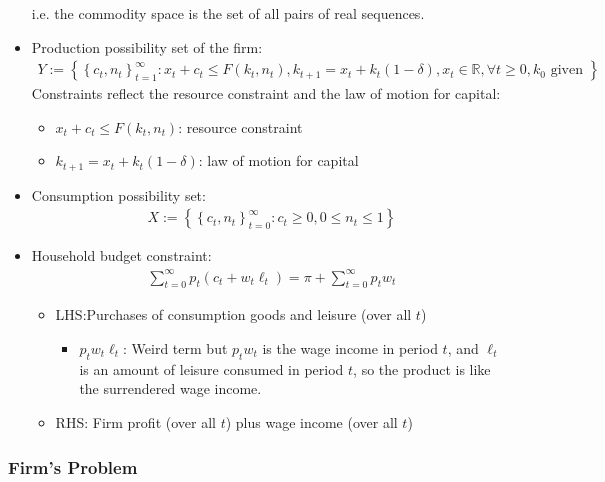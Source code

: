 \documentclass[10pt]{article}
\begin{document}
\begin{itemize}
        i.e. the commodity space is the set of all pairs of real sequences.
    \item Production possibility set of the firm: 
        \begin{align}
            Y:=\left\{\left\{c_t, n_t\right\}_{t=1}^{\infty}: x_t+c_t \leq F\left(k_t, n_t\right), k_{t+1}=x_t+k_t(1-\delta), x_t \in \mathbb{R}, \forall t \geq 0, k_0 \text { given }\right\}
        \end{align}
        Constraints reflect the resource constraint and the law of motion for capital:
        \begin{itemize}
            \item $x_t+c_t \leq F\left(k_t, n_t\right)$: resource constraint
            \item $k_{t+1}=x_t+k_t(1-\delta)$: law of motion for capital
        \end{itemize}
    \item Consumption possibility set:
        \begin{align}
            X:=\left\{\left\{c_t, n_t\right\}_{t=0}^{\infty}: c_t \geq 0,0 \leq n_t \leq 1\right\}
        \end{align}
    \item Household budget constraint:
        \begin{align}
            \sum_{t=0}^{\infty} p_t\left(c_t+w_t \ell_t\right)=\pi+\sum_{t=0}^{\infty} p_t w_t
        \end{align}
        \begin{itemize}
            \item LHS:Purchases of consumption goods and leisure (over all $t$)
                \begin{itemize}
                    \item $p_t w_t \ell_t$: Weird term but $p_t w_t$ is 
                        the wage income in period $t$, and $\ell_t$ 
                        is an amount of leisure consumed in period $t$,
                        so the product is like the surrendered wage income.
                \end{itemize}
            \item RHS: Firm profit (over all $t$) plus wage income (over all $t$)  
        \end{itemize}
\end{itemize}

\subsubsection{Firm's Problem}
\end{document}
